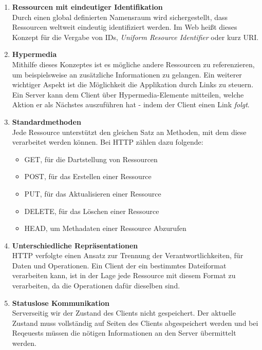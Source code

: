 \begin{enumerate}
	\item \textbf{Ressourcen mit eindeutiger Identifikation}\\
	Durch einen global definierten Namensraum wird sichergestellt, dass Ressourcen weltweit eindeutig identifiziert werden. Im Web heißt dieses Konzept für die Vergabe von IDs, \textit{Uniform Resource Identifier} oder kurz URI. 
	
	\item \textbf{Hypermedia}\\
	Mithilfe dieses Konzeptes ist es mögliche andere Ressourcen zu referenzieren, um beispielsweise an zusätzliche Informationen zu gelangen. Ein weiterer wichtiger Aspekt ist die Möglichkeit die Applikation durch Links zu steuern. Ein Server kann dem Client über Hypermedia-Elemente mitteilen, welche Aktion er als Nächstes auszuführen hat - indem der Client einen Link \textit{folgt}.
	
	\item \textbf{Standardmethoden}\\
	Jede Ressource unterstützt den gleichen Satz an Methoden, mit dem diese verarbeitet werden können. Bei HTTP zählen dazu folgende:
	\begin{itemize}
		\item GET, für die Dartstellung von Ressourcen
		\item POST, für das Erstellen einer Ressource
		\item PUT, für das Aktualisieren einer Ressource
		\item DELETE, für das Löschen einer Ressource
		\item HEAD, um Methadaten einer Ressource Abzurufen
	\end{itemize}

	
	\item \textbf{Unterschiedliche Repräsentationen}\\
	HTTP verfolgte einen Ansatz zur Trennung der Verantwortlichkeiten, für Daten und Operationen. Ein Client der ein bestimmtes Dateiformat verarbeiten kann, ist in der Lage jede Ressource mit diesem Format zu verarbeiten, da die Operationen dafür dieselben sind. 
	
	\item \textbf{Statuslose Kommunikation}\\
	Serverseitig wir der Zustand des Clients nicht gespeichert. Der aktuelle Zustand muss vollständig auf Seiten des Clients abgespeichert werden und bei Reqeuests müssen die nötigen Informationen an den Server übermittelt werden.
	
\end{enumerate}

